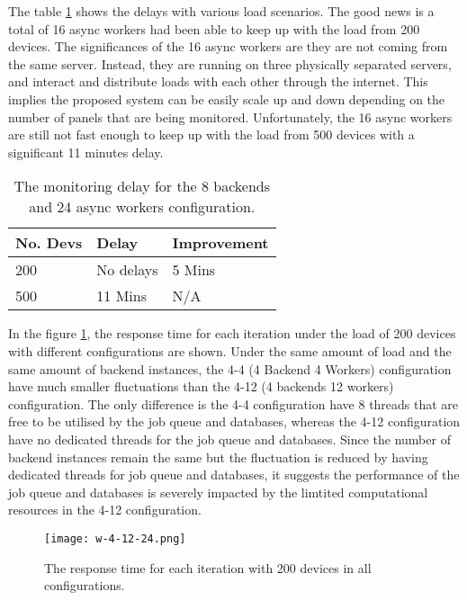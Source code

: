 \documentclass[../thesis.tex]{subfiles}
\begin{document}
The table \ref{tab:delay8-24} shows the delays with various load scenarios. The good news is a total of 16 async workers had been able to keep up with the load from 200 devices. The significances of the 16 async workers are they are not coming from the same server. Instead, they are running on three physically separated servers, and interact and distribute loads with each other through the internet. This implies the proposed system can be easily scale up and down depending on the number of panels that are being monitored. Unfortunately, the 16 async workers are still not fast enough to keep up with the load from 500 devices with a significant 11 minutes delay. 

\begin{table}[h!]
	\begin{center}
		\caption{The monitoring delay for the 8 backends and 24 async workers configuration.}
		\label{tab:delay8-24}
		\begin{tabular}{l|l|l}
			\toprule
			\textbf{No. Devs} & \textbf{Delay} & \textbf{Improvement}\\
			\midrule
			200 & No delays & 5 Mins	\\
			500 & 11 Mins & N/A\\
			\bottomrule
		\end{tabular}
	\end{center}
\end{table}



In the figure \ref{fig:w-4-12-24}, the response time for each iteration under the load of 200 devices with different configurations are shown. Under the same amount of load and the same amount of backend instances, the 4-4 (4 Backend 4 Workers) configuration have much smaller fluctuations than the 4-12 (4 backends 12 workers) configuration. The only difference is the 4-4 configuration have 8 threads that are free to be utilised by the job queue and databases, whereas the 4-12 configuration have no dedicated threads for the job queue and databases. Since the number of backend instances remain the same but the fluctuation is reduced by having dedicated threads for job queue and databases, it suggests the performance of the job queue and databases is severely impacted by the limtited computational resources in the 4-12 configuration. 

\begin{figure}[!ht]
	\centering
	\texttt{[image: w-4-12-24.png]}
	\caption{The response time for each iteration with 200 devices in all configurations.}
	\label{fig:w-4-12-24}
\end{figure}
\end{document}
